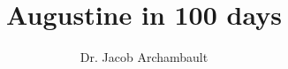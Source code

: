 \documentclass[a4paper,12pt]{book}
\begin{document}
\author{Dr. Jacob Archambault}
\title{Augustine in 100 days}

\frontmatter
\maketitle
\tableofcontents

\mainmatter






\backmatter
\end{document}
